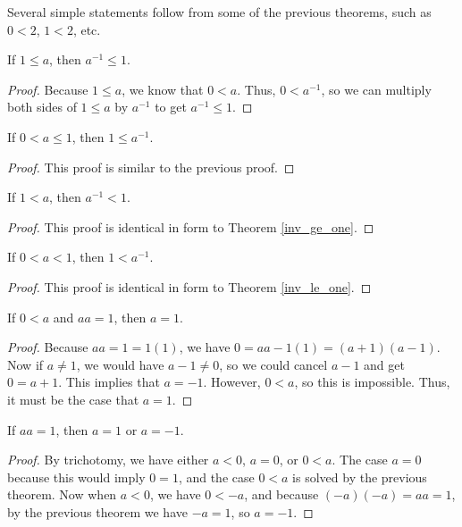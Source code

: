 \documentclass[../../math.tex]{subfiles}
\begin{document}
Several simple statements follow from some of the previous theorems, such as $0
< 2$, $1 < 2$, etc.

\begin{theorem} \label{inv_ge_one}
    If $1 \leq a$, then $a^{-1} \leq 1$.
\end{theorem}
\begin{proof}
    Because $1 \leq a$, we know that $0 < a$.  Thus, $0 < a^{-1}$, so we can
    multiply both sides of $1 \leq a$ by $a^{-1}$ to get $a^{-1} \leq 1$.
\end{proof}

\begin{theorem} \label{inv_le_one}
    If $0 < a \leq 1$, then $1 \leq a^{-1}$.
\end{theorem}
\begin{proof}
    This proof is similar to the previous proof.
\end{proof}

\begin{theorem}
    If $1 < a$, then $a^{-1} < 1$.
\end{theorem}
\begin{proof}
    This proof is identical in form to Theorem \ref{inv_ge_one}.
\end{proof}

\begin{theorem}
    If $0 < a < 1$, then $1 < a^{-1}$.
\end{theorem}
\begin{proof}
    This proof is identical in form to Theorem \ref{inv_le_one}.
\end{proof}

\begin{theorem}
    If $0 < a$ and $aa = 1$, then $a = 1$.
\end{theorem}
\begin{proof}
    Because $aa = 1 = 1(1)$, we have $0 = aa - 1(1) = (a + 1)(a - 1)$.  Now if
    $a \neq 1$, we would have $a - 1 \neq 0$, so we could cancel $a - 1$ and get
    $0 = a + 1$.  This implies that $a = -1$.  However, $0 < a$, so this is
    impossible.  Thus, it must be the case that $a = 1$.
\end{proof}

\begin{theorem}
    If $aa = 1$, then $a = 1$ or $a = -1$.
\end{theorem}
\begin{proof}
    By trichotomy, we have either $a < 0$, $a = 0$, or $0 < a$.  The case $a =
    0$ because this would imply $0 = 1$, and the case $0 < a$ is solved by the
    previous theorem.  Now when $a < 0$, we have $0 < -a$, and because $(-a)(-a)
    = aa = 1$, by the previous theorem we have $-a = 1$, so $a = -1$.
\end{proof}
\end{document}

